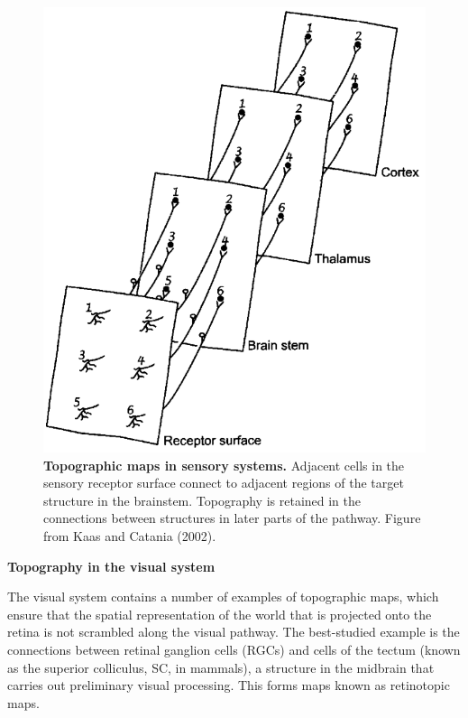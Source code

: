 \documentclass[11pt]{"article"}
\begin{document}
\pagebreak

\begin{figure}
\includegraphics[scale=0.3]{Topography}
\caption{\textbf{Topographic maps in sensory systems.} 
Adjacent cells in the sensory receptor surface connect to adjacent regions of the target structure in the brainstem. Topography is retained in the connections between structures in later parts of the pathway. Figure from Kaas and Catania (2002).}
\end{figure}

\vspace{15pt}

\textbf{Topography in the visual system}

The visual system contains a number of examples of topographic maps, which ensure that the spatial representation of the world that is projected onto the retina is not scrambled along the visual pathway. The best-studied example is the connections between retinal ganglion cells (RGCs) and cells of the tectum (known as the superior colliculus, SC, in mammals), a structure in the midbrain that carries out preliminary visual processing. This forms maps known as retinotopic maps.
\\
\end{document}
